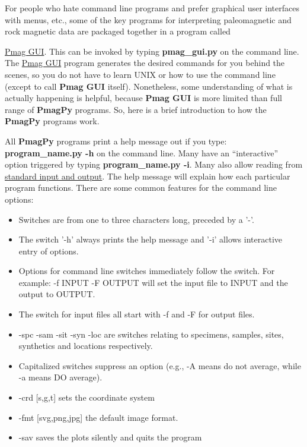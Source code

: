 \documentclass[11pt]{book}
\begin{document}
For people who hate command line programs and prefer graphical user interfaces with menus, etc., some of the key programs for interpreting paleomagnetic and rock magnetic data are packaged together in a program called {\href{#pmag_gui.py}{Pmag GUI}.  This can be invoked by typing {\bf pmag_gui.py} on the command line.
The \href{#pmag_gui.py}{Pmag GUI} program generates the desired commands for you behind the scenes, so you do not have to learn UNIX or how to use the command line (except to call {\bf Pmag GUI} itself).  Nonetheless, some understanding of what is actually happening is helpful, because {\bf Pmag GUI} is more limited than  full range of {\bf PmagPy} programs.  So, here is a brief introduction to how the {\bf PmagPy} programs work.

All {\bf PmagPy} programs print a help message out if you type: {\bf program\_name.py -h} on the command line.  Many have an ``interactive'' option triggered by typing {\bf program\_name.py -i}.  Many also allow reading from \href{#standard_IO }{standard input and output}.   The help message will explain how each particular program functions.  There are some common features for the command line options:


\begin{itemize}
\item Switches are from one to three characters long, preceded by a '-'.
\item The switch '-h' always prints the help message and '-i' allows interactive entry of options.
\item  Options for command line switches immediately follow the switch.  For example:  -f INPUT -F OUTPUT will set the input file to INPUT and the output to OUTPUT.
\item  The switch for input  files all start with -f and -F for output files.
\item -spc -sam -sit -syn  -loc are switches relating to specimens, samples, sites, synthetics and locations respectively.
\item Capitalized switches suppress an option (e.g., -A means do not average, while -a means DO average).
\item -crd [s,g,t] sets the coordinate system
\item -fmt [svg,png,jpg] the default image format.
\item -sav  saves the plots silently and quits the program
\end{itemize}
\newcommand{\stt}{\small\tt}
\newcount\exnum
\outer{}

}
\end{document}
